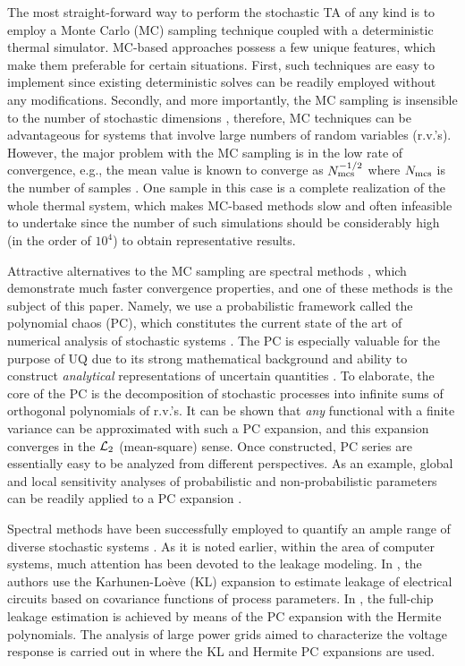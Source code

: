 The most straight-forward way to perform the stochastic TA of any kind is to employ a Monte Carlo (MC) sampling technique coupled with a deterministic thermal simulator. MC-based approaches possess a few unique features, which make them preferable for certain situations. First, such techniques are easy to implement since existing deterministic solves can be readily employed without any modifications. Secondly, and more importantly, the MC sampling is insensible to the number of stochastic dimensions \cite{maitre2010}, therefore, MC techniques can be advantageous for systems that involve large numbers of random variables (r.v.'s). However, the major problem with the MC sampling is in the low rate of convergence, e.g., the mean value is known to converge as $N_\text{mcs}^{-{{1}/{2}}}$ where $N_\text{mcs}$ is the number of samples \cite{xiu2009, maitre2010}. One sample in this case is a complete realization of the whole thermal system, which makes MC-based methods slow and often infeasible to undertake since the number of such simulations should be considerably high (in the order of $10^4$) to obtain representative results.

Attractive alternatives to the MC sampling are spectral methods \cite{maitre2010}, which demonstrate much faster convergence properties, and one of these methods is the subject of this paper. Namely, we use a probabilistic framework called the polynomial chaos (PC), which constitutes the current state of the art of numerical analysis of stochastic systems \cite{xiu2009}. The PC is especially valuable for the purpose of UQ due to its strong mathematical background and ability to construct \emph{analytical} representations of uncertain quantities \cite{eldred2009}. To elaborate, the core of the PC is the decomposition of stochastic processes into infinite sums of orthogonal polynomials of r.v.'s. It can be shown that \emph{any} functional with a finite variance can be approximated with such a PC expansion, and this expansion converges in the $\mathcal{L}_{2}$ (mean-square) sense. Once constructed, PC series are essentially easy to be analyzed from different perspectives. As an example, global and local sensitivity analyses of probabilistic and non-probabilistic parameters can be readily applied to a PC expansion \cite{eldred2009, maitre2010}.

Spectral methods have been successfully employed to quantify an ample range of diverse stochastic systems \cite{xiu2010}. As it is noted earlier, within the area of computer systems, much attention has been devoted to the leakage modeling. In \cite{bhardwaj2006}, the authors use the Karhunen-Lo\`{e}ve (KL) expansion \cite{loeve1978} to estimate leakage of electrical circuits based on covariance functions of process parameters. In \cite{shen2009}, the full-chip leakage estimation is achieved by means of the PC expansion with the Hermite polynomials. The analysis of large power grids aimed to characterize the voltage response is carried out in \cite{ghanta2006} where the KL and Hermite PC expansions are used.

